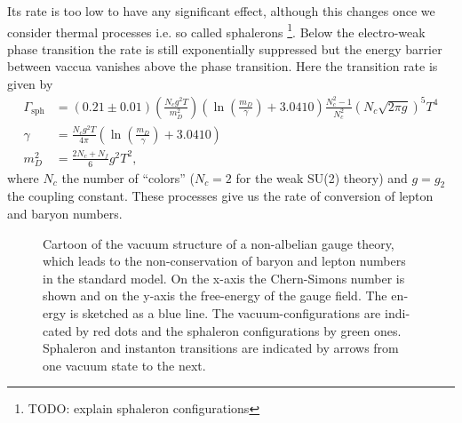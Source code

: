 \documentclass[master,       %
               twoside,        %
               BCOR10mm,       %
               english,ngerman, %
               ]{GAUBM}
\begin{document}
\begin{otherlanguage}{english}
Its rate is too low to have any significant effect, although this changes once we consider thermal processes i.e. so called sphalerons \footnote{TODO: explain sphaleron configurations}.
Below the electro-weak phase transition the rate is still exponentially suppressed but the energy barrier between vaccua vanishes above the phase transition. Here the transition rate is given by
\begin{align}
	\Gamma_{\mathrm{sph}} &= (0.21 \pm 0.01) \left(\frac{N_c g^2 T}{m_D^2} \right) \left(\ln \left(\frac{m_D}{\gamma} \right) + 3.0410 \right) \frac{N_c^2 - 1}{N_c^2} (N_c \sqrt{2 \pi g})^5 T^4 \\
	\gamma &= \frac{N_c g^2 T}{4 \pi} \left(\ln \left(\frac{m_D}{\gamma}\right) + 3.0410 \right) \nonumber \\
	m_D^2 &= \frac{2N_c + N_f}{6} g^2 T^2 \nonumber,
\end{align}
where $N_c$ the number of ``colors'' ($N_c = 2$ for the weak SU(2) theory) and $g = g_2$ the coupling constant.
These processes give us the rate of conversion of lepton and baryon numbers.

\begin{figure}[H]
	\centering
	\caption{Cartoon of the vacuum structure of a non-albelian gauge theory, which leads to the non-conservation of baryon and lepton numbers in the standard model.
		On the x-axis the Chern-Simons number is shown and on the y-axis the free-energy of the gauge field.
		The energy is sketched as a blue line. The vacuum-configurations are indicated by red dots and the sphaleron configurations by green ones. Sphaleron and instanton transitions are indicated by arrows from one vacuum state
		to the next.
	}
	\label{fig:sphaleron_cartoon}
\end{figure}



\end{otherlanguage}
\end{document}
